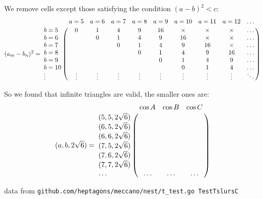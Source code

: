 \documentclass[11pt]{article}
\begin{document}
We remove cells except those satisfying the condition $(a-b)^2 < c$:
\begin {equation}\label{E:21}
(a_m - b_n)^2 =\bordermatrix{~ & a=5 & a=6 & a=7 & a=8 & a=9 & a=10 & a=11 & a=12 & \hdots\cr
b=5  & 0 & 1 & 4 &  9 & 16 & \times & \times & \times & \hdots \cr    
b=6  &   & 0 & 1 &  4 &  9 & 16 & \times & \times & \hdots \cr    
b=7  &   &   & 0 &  1 &  4 &  9 & 16 & \times & \hdots \cr    
b=8  &   &   &   &  0 &  1 &  4 &  9 & 16 & \hdots \cr    
b=9  &   &   &   &    &  0 &  1 &  4 &  9 & \hdots \cr    
b=10 &   &   &   &    &    &  0 &  1 &  4 & \hdots \cr    
\vdots & \vdots & \vdots & \vdots & \vdots & \vdots & \vdots & \vdots & \vdots & \ddots \cr}
\end {equation}

So we found that infinite triangles are valid, the smaller ones are:
\begin {equation}\label{E:4}
(a,b,2\sqrt{6}) =\bordermatrix{~ & \cos{A} & \cos{B} & \cos{C} \cr
(5,5,2\sqrt{6}) & \frac{}{} & \frac{}{} & \frac{}{} \cr
(6,5,2\sqrt{6}) & \frac{}{} & \frac{}{} & \frac{}{} \cr
(6,6,2\sqrt{6}) & \frac{}{} & \frac{}{} & \frac{}{} \cr
(7,5,2\sqrt{6}) & \frac{}{} & \frac{}{} & \frac{}{} \cr
(7,6,2\sqrt{6}) & \frac{}{} & \frac{}{} & \frac{}{} \cr
(7,7,2\sqrt{6}) & \frac{}{} & \frac{}{} & \frac{}{} \cr
\hdots & \hdots & \hdots & \hdots \cr}
\end{equation}

data from \texttt{github.com/heptagons/meccano/nest/t\_test.go TestTslursC}
\end{document}
